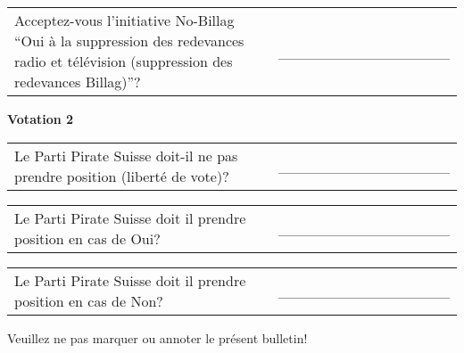 \documentclass[11pt, a4paper]{scrartcl}
\begin{document}
{\begin{minipage}[t][12.5cm][t]{17.7cm}
\begin{tabular}{ b{13.5cm} b{3cm} }
Acceptez-vous l'initiative No-Billag \enquote{Oui à la suppression des redevances radio et télévision (suppression des redevances Billag)}?
& \_\_\_\_\_\_\_\_\_\_\_\_\_\_\_\_ \\
\end{tabular}

\vspace{0.5cm}

\textbf{Votation 2}

\vspace{0.5cm}

\begin{tabular}{ b{13.5cm} b{3cm} }
Le Parti Pirate Suisse doit-il ne pas prendre position (liberté de vote)?
& \_\_\_\_\_\_\_\_\_\_\_\_\_\_\_\_ \\
\end{tabular}

\vspace{0.5cm}

\begin{tabular}{ b{13.5cm} b{3cm} }
Le Parti Pirate Suisse doit il prendre position en cas de Oui?
& \_\_\_\_\_\_\_\_\_\_\_\_\_\_\_\_ \\
\end{tabular}

\vspace{0.5cm}

\begin{tabular}{ b{13.5cm} b{3cm} }
Le Parti Pirate Suisse doit il prendre position en cas de Non?
& \_\_\_\_\_\_\_\_\_\_\_\_\_\_\_\_ \\
\end{tabular}

\vspace{0.5cm}

Veuillez ne pas marquer ou annoter le présent bulletin!


\end{minipage}


}
\end{document}
